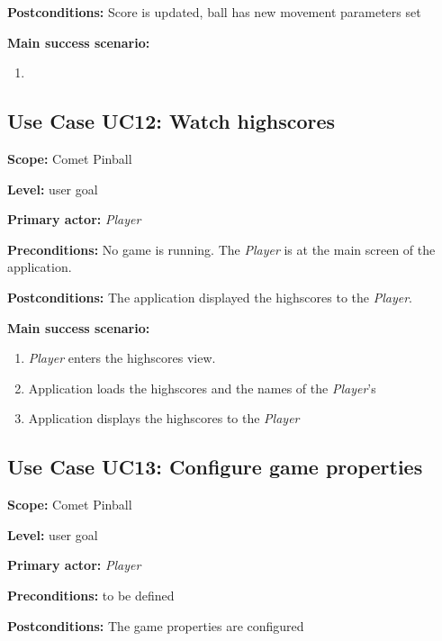 \documentclass[fontsize=12pt,
               paper=a4,
               twoside=false,
               parskip=half,
               ]{scrartcl}
\begin{document}
\textbf{\textsf{Postconditions:}} Score is updated, ball has new movement parameters set

\textbf{\textsf{Main success scenario:}}

\begin{enumerate}[leftmargin=3em]
	\item 
\end{enumerate}




\subsection{Use Case UC12: Watch highscores }

\textbf{\textsf{Scope:}} Comet Pinball

\textbf{\textsf{Level:}} user goal

\textbf{\textsf{Primary actor:}} \emph{Player}

\textbf{\textsf{Preconditions:}} No game is running. The \emph{Player} is at the main screen of the application.

\textbf{\textsf{Postconditions:}} The application displayed the highscores to the \emph{Player}.

\textbf{\textsf{Main success scenario:}}

\begin{enumerate}[leftmargin=3em]
	\item \emph{Player} enters the highscores view.
	\item Application loads the highscores and the names of the \emph{Player}'s
	\item Application displays the highscores to the \emph{Player}
\end{enumerate}




\subsection{Use Case UC13: Configure game properties }

\textbf{\textsf{Scope:}} Comet Pinball

\textbf{\textsf{Level:}} user goal

\textbf{\textsf{Primary actor:}} \emph{Player}

\textbf{\textsf{Preconditions:}} to be defined

\textbf{\textsf{Postconditions:}} The game properties are configured
\end{document}
